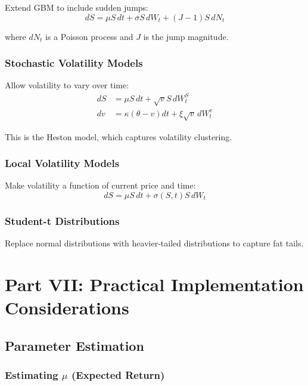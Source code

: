 \documentclass[12pt,a4paper]{article}
\begin{document}
Extend GBM to include sudden jumps:
\begin{equation}
dS = \mu S \, dt + \sigma S \, dW_t + (J-1) S \, dN_t
\end{equation}

where $dN_t$ is a Poisson process and $J$ is the jump magnitude.

\subsubsection{Stochastic Volatility Models}

Allow volatility to vary over time:
\begin{align}
dS &= \mu S \, dt + \sqrt{v} S \, dW_t^S \\
dv &= \kappa(\theta - v) dt + \xi \sqrt{v} \, dW_t^v
\end{align}

This is the Heston model, which captures volatility clustering.

\subsubsection{Local Volatility Models}

Make volatility a function of current price and time:
\begin{equation}
dS = \mu S \, dt + \sigma(S, t) S \, dW_t
\end{equation}

\subsubsection{Student-t Distributions}

Replace normal distributions with heavier-tailed distributions to capture fat tails.

\newpage

\section{Part VII: Practical Implementation Considerations}

\subsection{Parameter Estimation}

\subsubsection{Estimating $\mu$ (Expected Return)}
\end{document}
